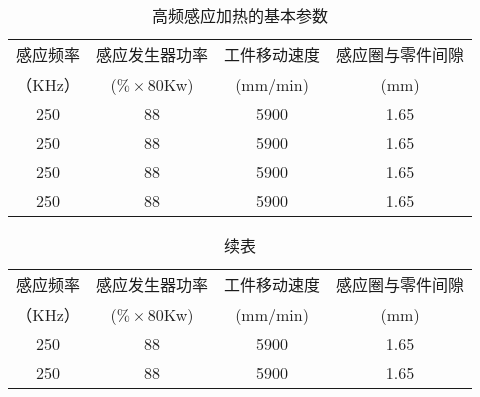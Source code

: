 \begin{table}[H]
    \centering
    \caption{高频感应加热的基本参数}
    \begin{tabular}{|c| c|c|c|}
    \hline
    感应频率 &感应发生器功率 & 工件移动速度  &感应圈与零件间隙\\
    （KHz）&($\% \times$80Kw) &(mm/min)  &(mm)\\
    \hline
    250 &88 &5900 &1.65\\
    \hline
    250 &88 &5900 &1.65\\
    \hline
    250 &88 &5900 &1.65\\
    \hline
    250 &88 &5900 &1.65\\
    \hline
    \end{tabular}
\end{table}


\begin{table}
    \centering
    \captionsetup{singlelinecheck=off}
    \caption*{续表} %
    \begin{tabular}{|c| c|c|c|}
    \hline
    感应频率 &感应发生器功率 & 工件移动速度  &感应圈与零件间隙\\
    （KHz）&($\% \times$80Kw) &(mm/min)  &(mm)\\
    \hline
    250 &88 &5900 &1.65\\
    \hline
    250 &88 &5900 &1.65\\
    \hline
    \end{tabular}
\end{table}
